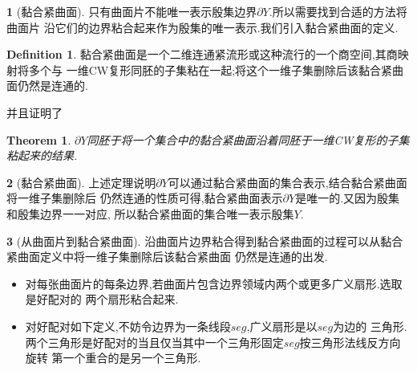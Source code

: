 \documentclass[UTF8]{ctexbeamer}	%
\theoremstyle{plain}
\newtheorem{rtm}{Theorem}[section]
\theoremstyle{definition}
\newtheorem{emt}{}[section]
\newtheorem{defn}{Definition}[section]
\theoremstyle{remark}
\numberwithin{equation}{section}
\begin{document}
\begin{frame}
    \begin{emt}[黏合紧曲面]
        只有曲面片不能唯一表示殷集边界$\partial Y$.所以需要找到合适的方法将曲面片
        沿它们的边界粘合起来作为殷集的唯一表示.我们引入黏合紧曲面的定义.

        \begin{defn}
            黏合紧曲面是一个二维连通紧流形或这种流行的一个商空间,其商映射将多个与
            一维CW复形同胚的子集粘在一起;将这个一维子集删除后该黏合紧曲面仍然是连通的.
        \end{defn}

        并且证明了
\begin{rtm}
    $\partial Y$同胚于将一个集合中的黏合紧曲面沿着同胚于一维CW复形的子集粘起来的结果.
\end{rtm}

    \end{emt}
\end{frame}

\begin{frame}
    \begin{emt}[黏合紧曲面]
        上述定理说明$\partial Y$可以通过黏合紧曲面的集合表示,结合黏合紧曲面将一维子集删除后
        仍然连通的性质可得,黏合紧曲面表示$\partial Y$是唯一的.又因为殷集和殷集边界一一对应,
        所以黏合紧曲面的集合唯一表示殷集$Y$.
    \end{emt}

    \begin{emt}[从曲面片到黏合紧曲面]
        沿曲面片边界粘合得到黏合紧曲面的过程可以从黏合紧曲面定义中将一维子集删除后该黏合紧曲面
        仍然是连通的出发.

        \begin{itemize}
            \item 对每张曲面片的每条边界,若曲面片包含边界领域内两个或更多广义扇形.选取是好配对的
            两个扇形粘合起来.
            \item 对好配对如下定义,不妨令边界为一条线段$seg$,广义扇形是以$seg$为边的
            三角形.两个三角形是好配对的当且仅当其中一个三角形固定$seg$按三角形法线反方向旋转
            第一个重合的是另一个三角形.
        \end{itemize}
        
    \end{emt}
\end{frame}
\end{document}
